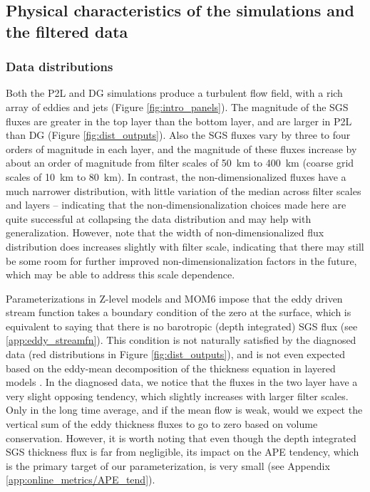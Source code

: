 \documentclass[draft]{agujournal2019}
\begin{document}
\subsection{Physical characteristics of the simulations and the filtered data}
\subsubsection{Data distributions}
Both the P2L and DG simulations produce a turbulent flow field, with a rich array of eddies and jets (Figure \ref{fig:intro_panels}).
The magnitude of the SGS fluxes are greater in the top layer than the bottom layer, and are larger in P2L than DG (Figure \ref{fig:dist_outputs}). Also the SGS fluxes vary by three to four orders of magnitude in each layer, and the magnitude of these fluxes increase by about an order of magnitude from filter scales of 50~km to 400~km (coarse grid scales of 10~km to 80~km). 
In contrast, the non-dimensionalized fluxes have a much narrower distribution, with little variation of the median across filter scales and layers -- indicating that the non-dimensionalization choices made here are quite successful at collapsing the data distribution and may help with generalization. However, note that the width of non-dimensionalized flux distribution does increases slightly with filter scale, indicating that there may still be some room for further improved non-dimensionalization factors in the future, which may be able to address this scale dependence. 

Parameterizations in Z-level models and MOM6 impose that the eddy driven stream function takes a boundary condition of the zero at the surface, which is equivalent to saying that there is no barotropic (depth integrated) SGS flux (see \ref{app:eddy_streamfn}). This condition is not naturally satisfied by the diagnosed data (red distributions in Figure \ref{fig:dist_outputs}), and is not even expected based on the eddy-mean decomposition of the thickness equation in layered models \cite{killworth2001boundary}. In the diagnosed data, we notice that the fluxes in the two layer have a very slight opposing tendency, which slightly increases with larger filter scales. Only in the long time average, and if the mean flow is weak, would we expect the vertical sum of the eddy thickness fluxes to go to zero based on volume conservation. However, it is worth noting that even though the depth integrated SGS thickness flux is far from negligible, its impact on the APE tendency, which is the primary target of our parameterization, is very small (see Appendix \ref{app:online_metrics/APE_tend}).
\end{document}

